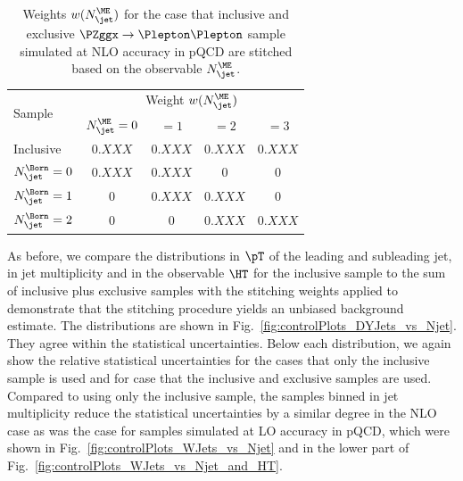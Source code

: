 \begin{table}[h!]
\centering
\begin{tabular}{l|cccc}
\hline
\multirow{2}{20mm}{Sample} & \multicolumn{4}{c}{Weight $w(N_{\jet}^{\ME})$} \\
                           & $N_{\jet}^{\ME} = 0$ & $= 1$   & $= 2$   & $= 3$ \\
\hline
\hline
Inclusive                  & $0.XXX$              & $0.XXX$ & $0.XXX$ & $0.XXX$ \\
\hline
$N_{\jet}^{\Born} = 0$     & $0.XXX$              & $0.XXX$ & $0$     & $0$     \\
$N_{\jet}^{\Born} = 1$     & $0$                  & $0.XXX$ & $0.XXX$ & $0$     \\
$N_{\jet}^{\Born} = 2$     & $0$                  & $0$     & $0.XXX$ & $0.XXX$ \\
\hline
\end{tabular}
\caption{
  Weights $w(N_{\jet}^{\ME})$ for the case that inclusive and exclusive $\PZggx \to \Plepton\Plepton$ sample simulated at NLO accuracy in pQCD
  are stitched based on the observable $N_{\jet}^{\ME}$.
}
\label{tab:weights_DYJets_vs_Njet}
\end{table}

As before, we compare the distributions in $\pT$ of the leading and subleading jet,
in jet multiplicity and in the observable $\HT$ 
for the inclusive sample to the sum of inclusive plus exclusive samples with the stitching weights applied
to demonstrate that the stitching procedure yields an unbiased background estimate.
The distributions are shown in Fig.~\ref{fig:controlPlots_DYJets_vs_Njet}.
They agree within the statistical uncertainties.
Below each distribution, we again show the relative statistical uncertainties for the cases that only the inclusive sample is used
and for case that the inclusive and exclusive samples are used.
Compared to using only the inclusive sample,
the samples binned in jet multiplicity reduce the statistical uncertainties by a similar degree in the NLO case
as was the case for samples simulated at LO accuracy in pQCD, 
which were shown in Fig.~\ref{fig:controlPlots_WJets_vs_Njet} and in the lower part of Fig.~\ref{fig:controlPlots_WJets_vs_Njet_and_HT}.


